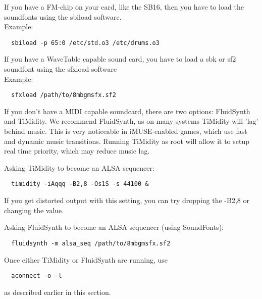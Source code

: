If you have a FM-chip on your card, like the SB16, then you have to load
the soundfonts using the sbiload software. \\
Example:
\begin{verbatim}
  sbiload -p 65:0 /etc/std.o3 /etc/drums.o3
\end{verbatim}
%
If you have a WaveTable capable sound card, you have to load a sbk or sf2
soundfont using the sfxload software\\
Example:
\begin{verbatim}
  sfxload /path/to/8mbgmsfx.sf2
\end{verbatim}
%
If you don't have a MIDI capable soundcard, there are two options: FluidSynth
and TiMidity. We recommend FluidSynth, as on many systems TiMidity will 'lag'
behind music. This is very noticeable in iMUSE-enabled games, which use fast
and dynamic music transitions. Running TiMidity as root will allow it to
setup real time priority, which may reduce music lag.

Asking TiMidity to become an ALSA sequencer:
\begin{verbatim}
  timidity -iAqqq -B2,8 -Os1S -s 44100 &
\end{verbatim}
If you get distorted output with this setting, you can try dropping the 
-B2,8 or changing the value.

Asking FluidSynth to become an ALSA sequencer (using SoundFonts):
\begin{verbatim}
  fluidsynth -m alsa_seq /path/to/8mbgmsfx.sf2
\end{verbatim}
%
Once either TiMidity or FluidSynth are running, use
\begin{verbatim}
  aconnect -o -l
\end{verbatim}
as described earlier in this section.


